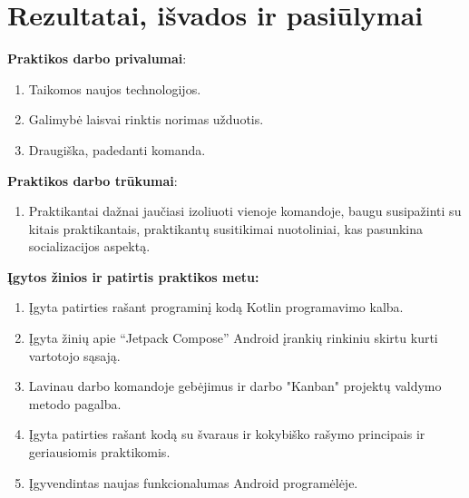 \documentclass{VUMIFPSPraktika}
\begin{document}
\maketitle
\tableofcontents






\section{Rezultatai, išvados ir pasiūlymai}

\textbf{Praktikos darbo privalumai}:
\begin{enumerate}
    \item Taikomos naujos technologijos.
    \item Galimybė laisvai rinktis norimas užduotis.
    \item Draugiška, padedanti komanda.
\end{enumerate}
\bigskip

\textbf{Praktikos darbo trūkumai}:
\begin{enumerate}
    \item Praktikantai dažnai jaučiasi izoliuoti vienoje komandoje, baugu susipažinti su kitais praktikantais, praktikantų susitikimai nuotoliniai, kas pasunkina socializacijos aspektą.
\end{enumerate}
\bigskip

\textbf{Įgytos žinios ir patirtis praktikos metu:}
\begin{enumerate}
    \item Įgyta patirties rašant programinį kodą Kotlin programavimo kalba.
    \item Įgyta žinių apie “Jetpack Compose” Android įrankių rinkiniu skirtu kurti vartotojo sąsają.
    \item Lavinau darbo komandoje gebėjimus ir darbo "Kanban" projektų valdymo metodo pagalba.
    \item Įgyta patirties rašant kodą su švaraus ir kokybiško rašymo principais ir geriausiomis praktikomis. 
    \item Įgyvendintas naujas funkcionalumas Android programėlėje.
\end{enumerate}
\bigskip
\end{document}

